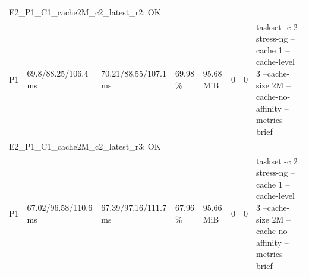 \begin{tabular}{llllllll}
\multicolumn{8}{l}{E2\_P1\_C1\_cache2M\_c2\_latest\_r2; OK} \\
P1 & 69.8/88.25/106.4 ms & 70.21/88.55/107.1 ms & 69.98 \% & 95.68 MiB & 0 & 0 & taskset -c 2 stress-ng --cache 1 --cache-level 3 --cache-size 2M --cache-no-affinity --metrics-brief \\
\multicolumn{8}{l}{E2\_P1\_C1\_cache2M\_c2\_latest\_r3; OK} \\
P1 & 67.02/96.58/110.6 ms & 67.39/97.16/111.7 ms & 67.96 \% & 95.66 MiB & 0 & 0 & taskset -c 2 stress-ng --cache 1 --cache-level 3 --cache-size 2M --cache-no-affinity --metrics-brief \\
\bottomrule
\end{tabular}
